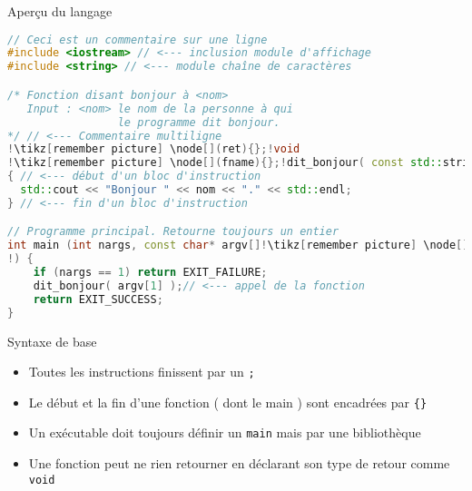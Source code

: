 \documentclass[handout,10pt]{beamer}
\newcommand{\includecode}[2][cpp]{

}
\begin{document}
\begin{frame}[fragile]{Aperçu du langage}
\tiny
\hfill\begin{minipage}{0.66\linewidth}
\begin{lstlisting}[escapechar=!, language=C++,linewidth=0.9\linewidth]
// Ceci est un commentaire sur une ligne
#include <iostream> // <--- inclusion module d'affichage
#include <string> // <--- module chaîne de caractères 

/* Fonction disant bonjour à <nom>
   Input : <nom> le nom de la personne à qui
                 le programme dit bonjour.
*/ // <--- Commentaire multiligne
!\tikz[remember picture] \node[](ret){};!void
!\tikz[remember picture] \node[](fname){};!dit_bonjour( const std::string& nom!\tikz[remember picture] \node[](args) {};! )
{ // <--- début d'un bloc d'instruction
  std::cout << "Bonjour " << nom << "." << std::endl;
} // <--- fin d'un bloc d'instruction

// Programme principal. Retourne toujours un entier
int main (int nargs, const char* argv[]!\tikz[remember picture] \node[](margs){};
!) {
    if (nargs == 1) return EXIT_FAILURE;
    dit_bonjour( argv[1] );// <--- appel de la fonction
    return EXIT_SUCCESS;
}
\end{lstlisting}
\end{minipage}

\begin{block}{Syntaxe de base}
\begin{itemize}
 \item Toutes les instructions finissent par un \lstinline$;$
 \item Le début et la fin d'une fonction ( dont le main ) sont encadrées par \lstinline${}$
 \item Un exécutable doit toujours définir un \lstinline$main$ mais par une bibliothèque
 \item Une fonction peut ne rien retourner en déclarant son type de retour comme \lstinline$void$
\end{itemize}
\end{block}


\end{frame}
\end{document}
